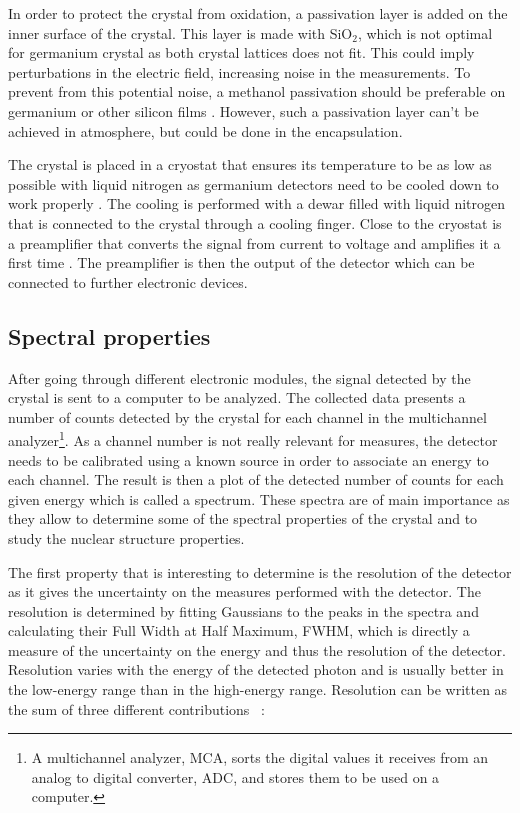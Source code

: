 \documentclass[11pt,a4paper]{article}
\begin{document}
In order to protect the crystal from oxidation, a passivation layer is added on the inner surface of the crystal. This layer is made with SiO$_2$, which is not optimal for germanium crystal as both crystal lattices does not fit. This could imply perturbations in the electric field, increasing noise in the measurements. To prevent from this potential noise, a methanol passivation \cite{Napoli} should be preferable on germanium or other silicon films \cite{Xie}. However, such a passivation layer can't be achieved in atmosphere, but could be done in the encapsulation.

The crystal is placed in a cryostat that ensures its temperature to be as low as possible with liquid nitrogen as germanium detectors need to be cooled down to work properly \cite{Knoll}. The cooling is performed with a dewar filled with liquid nitrogen that is connected to the crystal through a cooling finger. Close to the cryostat is a preamplifier that converts the signal from current to voltage and amplifies it a first time \cite{Tsoulfanidis}. The preamplifier is then the output of the detector which can be connected to further electronic devices.

\subsection{Spectral properties} \label{spectral}

After going through different electronic modules, the signal detected by the crystal is sent to a computer to be analyzed. The collected data presents a number of counts detected by the crystal for each channel in the multichannel analyzer\footnote{A multichannel analyzer, MCA, sorts the digital values it receives from an analog to digital converter, ADC, and stores them to be used on a computer.}. As a channel number is not really relevant for measures, the detector needs to be calibrated using a known source in order to associate an energy to each channel. The result is then a plot of the detected number of counts for each given energy which is called a spectrum. These spectra are of main importance as they allow to determine some of the spectral properties of the crystal and to study the nuclear structure properties.

The first property that is interesting to determine is the resolution of the detector as it gives the uncertainty on the measures performed with the detector. The resolution is determined by fitting Gaussians to the peaks in the spectra and calculating their Full Width at Half Maximum, FWHM, which is directly a measure of the uncertainty on the energy and thus the resolution of the detector. Resolution varies with the energy of the detected photon and is usually better in the low-energy range than in the high-energy range. Resolution can be written as the sum of three different contributions \cite{Tsoulfanidis}~:
\end{document}
